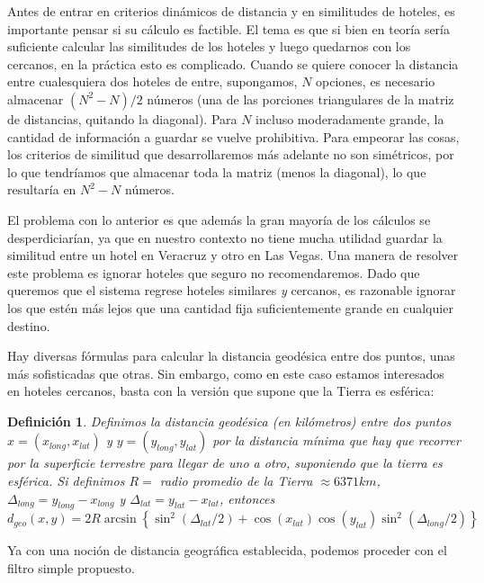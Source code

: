 \documentclass[12pt]{report}
\newtheorem{defn}{Definici\'on}[chapter]
\begin{document}
Antes de entrar en criterios dinámicos de distancia y en similitudes de hoteles, es importante pensar si su cálculo es factible. El tema es que si bien en teoría sería suficiente calcular las similitudes de los hoteles y luego quedarnos con los cercanos, en la práctica esto es complicado. Cuando se quiere conocer la distancia entre cualesquiera dos hoteles de entre, supongamos, $N$ opciones, es necesario almacenar $(N^2 - N)/2$ números (una de las porciones triangulares de la matriz de distancias, quitando la diagonal). Para $N$ incluso moderadamente grande, la cantidad de información a guardar se vuelve prohibitiva. Para empeorar las cosas, los criterios de similitud que desarrollaremos más adelante no son simétricos, por lo que tendríamos que almacenar toda la matriz (menos la diagonal), lo que resultaría en $N^2 - N$ números.

El problema con lo anterior es que además la gran mayoría de los cálculos se desperdiciarían, ya que en nuestro contexto no tiene mucha utilidad guardar la similitud entre un hotel en Veracruz y otro en Las Vegas. Una manera de resolver este problema es ignorar hoteles que seguro no recomendaremos. Dado que queremos que el sistema regrese hoteles similares \emph{y} cercanos, es razonable ignorar los que estén más lejos que una cantidad fija suficientemente grande en cualquier destino.

Hay diversas fórmulas para calcular la distancia geodésica entre dos puntos, unas más sofisticadas que otras. Sin embargo, como en este caso estamos interesados en hoteles cercanos, basta con la versión que supone que la Tierra es esférica:
\begin{defn}
Definimos la distancia geodésica (en kilómetros) entre dos puntos $x = (x_{long}, x_{lat})$ y $y = (y_{long}, y_{lat})$ por la distancia mínima que hay que recorrer por la superficie terrestre para llegar de uno a otro, suponiendo que la tierra es esférica. Si definimos $R =$ radio promedio de la Tierra $\approx 6371 km$, $\Delta_{long} = y_{long} - x_{long}$ y $\Delta_{lat} = y_{lat} - x_{lat}$, entonces
\[
d_{geo}(x,y) = 2 R \arcsin\left\{\sin^2(\Delta_{lat}/2) + \cos(x_{lat}) \cos(y_{lat}) \sin^2(\Delta_{long}/2) \right\}
\]
\end{defn}

Ya con una noción de distancia geográfica establecida, podemos proceder con el filtro simple propuesto.
\end{document}
